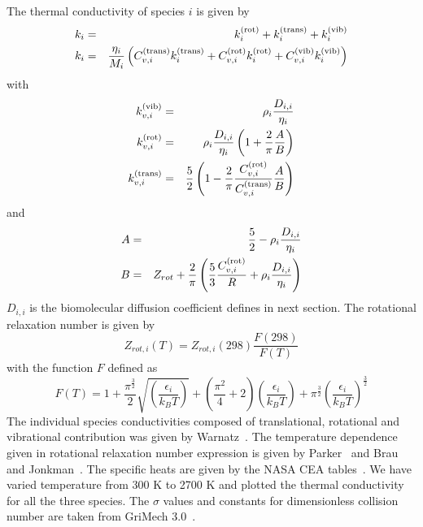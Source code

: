 The thermal conductivity of species $i$ is given by
\begin{eqnarray*}
k_i &=& k_i^{(\textnormal{rot})} + k_i^{(\textnormal{trans})} + k_i^{(\textnormal{vib})} \\
k_i &=& \frac{\eta_i}{M_i} \left(
                        C_{v,i}^{(\textnormal{trans})} k_i^{(\textnormal{trans})} + C_{v,i}^{(\textnormal{rot})} k_i^{(\textnormal{rot})}+ C_{v,i}^{(\textnormal{vib})}  k_i^{(\textnormal{vib})}
                                          \right)
\end{eqnarray*}
with
\begin{eqnarray*}
k_{v,i}^{(\textnormal{vib})}   & =& \rho_i \frac{D_{i,i}}{\eta_i} \\
k_{v,i}^{(\textnormal{rot})}   & =& \rho_i \frac{D_{i,i}}{\eta_i}\left(1 + \frac{2}{\pi}\frac{A}{B}\right) \\
k_{v,i}^{(\textnormal{trans})}   & =&  \frac{5}{2} \left(1 - \frac{2}{\pi}\frac{C_{v,i}^{(\textnormal{rot})}}{C_{v,i}^{(\textnormal{trans})}}\frac{A}{B}\right)
\end{eqnarray*}
%
and
%
\begin{eqnarray*}
  A & = & \frac{5}{2} -  \rho_i \frac{D_{i,i}}{\eta_i}  \\
  B & = & Z_{rot} + \frac{2}{\pi} \left(\frac{5}{3}\frac{C_{v,i}^{(\textnormal{rot})}}{R} + \rho_i \frac{D_{i,i}}{\eta_i}\right)
\end{eqnarray*}
%
$D_{i,i}$ is the biomolecular diffusion coefficient defines in next section. The rotational relaxation number is given by
\begin{equation}
Z_{rot,i}(T) = Z_{rot,i}(298)\frac{F(298)}{F(T)}
\label{thermal_cond:Zrot}
\end{equation}
 with the function $F$ defined as
\begin{equation}
F(T) = 1 + \frac{\pi^{\frac{3}{2}}}{2}\sqrt{\left(\frac{\epsilon_i}{k_B T}\right)}
         + \left(\frac{\pi^2}{4} + 2\right)\left(\frac{\epsilon_i}{k_B T}\right)
         + \pi^{\frac{3}{2}}\left(\frac{\epsilon_i}{k_B T}\right)^{\frac{3}{2}}
\end{equation}
%
The individual species conductivities composed of translational,
rotational and vibrational contribution was given by
Warnatz~\cite{Warnatz}. The temperature dependence given in rotational
relaxation number expression is given by Parker~\cite{Parker} and Brau
and Jonkman~\cite{Jonkman}. The specific heats are given by the NASA CEA
 tables~\cite{CEATables}.  We have varied temperature from 300 K to 2700 K
and plotted the thermal conductivity for all the three
species. The $\sigma$ values and constants for dimensionless collision
number are taken from GriMech 3.0~\cite{gri}.


